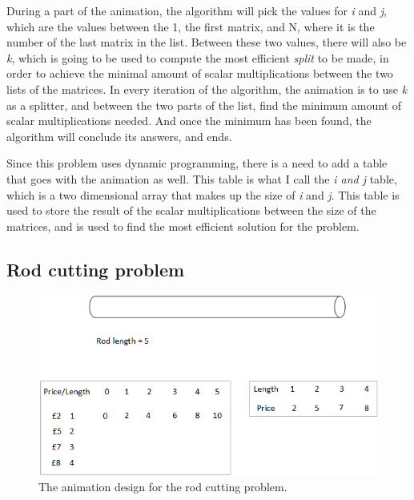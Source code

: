 During a part of the animation, the algorithm will pick the values for \textit{i} and \textit{j}, which are the values between the 1, the first matrix, and N, where it is the number of the last matrix in the list. Between these two values, there will also be \textit{k}, which is going to be used to compute the most efficient \textit{split} to be made, in order to achieve the minimal amount of scalar multiplications between the two lists of the matrices. In every iteration of the algorithm, the animation is to use \textit{k} as a splitter, and between the two parts of the list, find the minimum amount of scalar multiplications needed. And once the minimum has been found, the algorithm will conclude its answers, and ends.

Since this problem uses dynamic programming, there is a need to add a table that goes with the animation as well. This table is what I call the \textit{i and j} table, which is a two dimensional array that makes up the size of \textit{i} and \textit{j}. This table is used to store the result of the scalar multiplications between the size of the matrices, and is used to find the most efficient solution for the problem. 

%

\subsection{Rod cutting problem}

\begin{figure}[H]
\centering
\includegraphics[scale=0.9]{images/report_images/animationDesignRodCuttingProblem.png}
\caption{The animation design for the rod cutting problem.}
\label{animationDesignRodCuttingProblem}
\end{figure}

